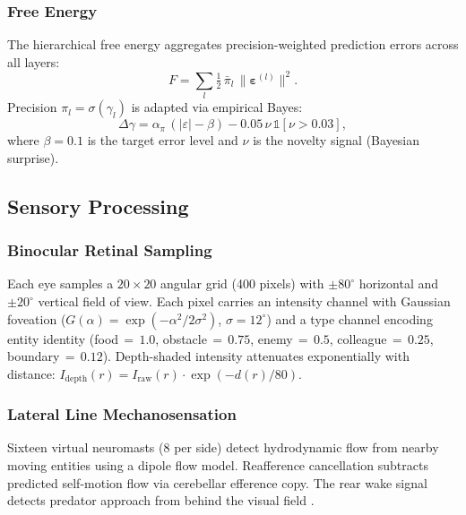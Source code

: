 \documentclass[12pt]{article}
\begin{document}
\subsubsection{Free Energy}

The hierarchical free energy aggregates precision-weighted prediction
errors across all layers:
\begin{equation}\label{eq:free_energy}
  F = \sum_{l} \tfrac{1}{2}\,\bar{\pi}_l\,
      \bigl\|\boldsymbol{\varepsilon}^{(l)}\bigr\|^2.
\end{equation}
Precision $\pi_l = \sigma(\gamma_l)$ is adapted via empirical Bayes:
\begin{equation}\label{eq:precision}
  \Delta\gamma = \alpha_\pi\,(|\varepsilon| - \beta)
    - 0.05\,\nu\,\mathbb{1}[\nu > 0.03],
\end{equation}
where $\beta = 0.1$ is the target error level and $\nu$ is the
novelty signal (Bayesian surprise).

\subsection{Sensory Processing}\label{sec:sensory}

\subsubsection{Binocular Retinal Sampling}

Each eye samples a $20 \times 20$ angular grid (400 pixels) with
$\pm 80^\circ$ horizontal and $\pm 20^\circ$ vertical field of view.
Each pixel carries an intensity channel with Gaussian foveation
($G(\alpha) = \exp(-\alpha^2 / 2\sigma^2)$, $\sigma = 12^\circ$)
and a type channel encoding entity identity (food$\,{=}\,1.0$,
obstacle$\,{=}\,0.75$, enemy$\,{=}\,0.5$, colleague$\,{=}\,0.25$,
boundary$\,{=}\,0.12$).
Depth-shaded intensity attenuates exponentially with distance:
$I_\text{depth}(r) = I_\text{raw}(r) \cdot \exp(-d(r)/80)$.

\subsubsection{Lateral Line Mechanosensation}

Sixteen virtual neuromasts (8 per side) detect hydrodynamic flow from
nearby moving entities using a dipole flow model.
Reafference cancellation subtracts predicted self-motion flow via
cerebellar efference copy.
The rear wake signal detects predator approach from behind the
visual field \citep{stewart2013}.
\end{document}
